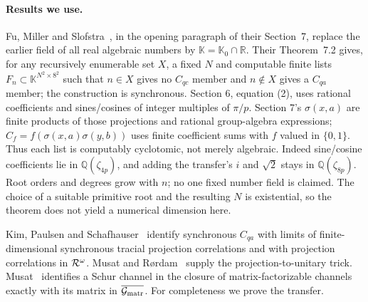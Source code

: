 \paragraph{Results we use.}
Fu, Miller and Slofstra~\cite{FMS}, in the opening paragraph of their Section~7, replace the earlier field of all real algebraic numbers by $\mathbb K=\mathbb K_0\cap\mathbb R$. Their Theorem~7.2 gives, for any recursively enumerable set $X$, a fixed $N$ and computable finite lists $F_n\subset\mathbb K^{N^2\times8^2}$ such that $n\in X$ gives no $C_{qc}$ member and $n\notin X$ gives a $C_{qa}$ member; the construction is synchronous. Section 6, equation (2), uses rational coefficients and sines/cosines of integer multiples of $\pi/p$. Section 7's $\sigma(x,a)$ are finite products of those projections and rational group-algebra expressions; $C_f=f(\sigma(x,a)\sigma(y,b))$ uses finite coefficient sums with $f$ valued in $\{0,1\}$. Thus each list is computably cyclotomic, not merely algebraic. Indeed sine/cosine coefficients lie in $\mathbb Q(\zeta_{4p})$, and adding the transfer's $i$ and $\sqrt2$ stays in $\mathbb Q(\zeta_{8p})$. Root orders and degrees grow with $n$; no one fixed number field is claimed. The choice of a suitable primitive root and the resulting $N$ is existential, so the theorem does not yield a numerical dimension here.

Kim, Paulsen and Schafhauser~\cite[Thm.~3.6]{KPS18} identify synchronous $C_{qa}$ with limits of finite-dimensional synchronous tracial projection correlations and with projection correlations in $\mathcal R^\omega$. Musat and R{\o}rdam~\cite[Prop.~3.2]{MusatRordam} supply the projection-to-unitary trick. Musat~\cite[Prop.~3.9(iii)]{Musat25} identifies a Schur channel in the closure of matrix-factorizable channels exactly with its matrix in $\overline{\mathcal G_{\rm matr}}$. For completeness we prove the transfer.

